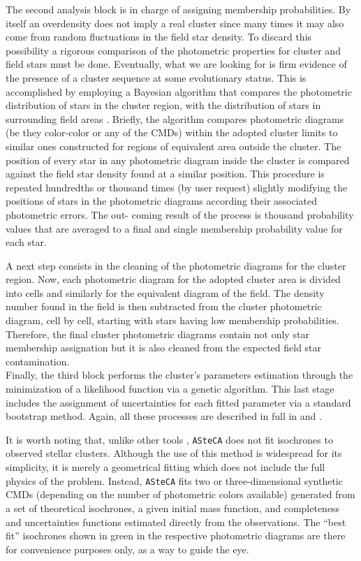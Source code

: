 \documentclass{aa}
\begin{document}
The second analysis block is in charge of assigning membership probabilities. By
itself an overdensity does not imply a real cluster since many times it may also
come from random fluctuations in the field star density. To discard this
possibility a rigorous comparison of the photometric
properties for cluster and field stars must be done. Eventually, what we
are looking for is firm evidence of the presence of a cluster sequence at some
evolutionary status. This is accomplished by employing a Bayesian algorithm that
compares the photometric distribution of stars in the cluster region, with the
distribution of stars in surrounding field areas \citep{Perren_2015}. Briefly,
the algorithm compares photometric diagrams (be they color-color or any of the
CMDs) within the adopted cluster limits to similar ones constructed for regions
of equivalent area outside the cluster. The position of every star in any
photometric diagram inside the cluster is compared against the field star
density found at a similar position. This procedure is repeated hundredths or
thousand times (by user request) slightly modifying the positions of stars in
the photometric diagrams according their associated photometric errors. The out-
coming result of the process is thousand probability values that are averaged to
a final and single membership probability value for each star.

A next step consists in the cleaning of the photometric diagrams for the cluster
region. Now, each photometric diagram for the adopted cluster area is divided
into cells and similarly for the equivalent diagram of the field. The
density number found in the field is then subtracted from the cluster
photometric diagram, cell by cell, starting with stars having low membership
probabilities. Therefore, the final cluster photometric diagrams contain not
only star membership assignation but it is also cleaned from the expected field
star contamination.\\

Finally, the third block performs the cluster's parameters estimation through
the minimization of a likelihood function via a genetic algorithm. This last
stage includes the assignment of uncertainties for each fitted parameter via a
standard bootstrap method. Again, all these processes are described in full in
\cite{Perren_2015} and \cite{Perren_2017}.

It is worth noting that, unlike other tools \citep[e.g.:][]{Yen_2018},
\texttt{ASteCA} does not fit isochrones to observed stellar clusters. Although
the use of this method is widespread for its simplicity, it is merely a
geometrical fitting which does not include the full physics of the problem.
Instead, \texttt{ASteCA} fits two or three-dimensional synthetic CMDs (depending
on the number of photometric colors available) generated from a set of
theoretical isochrones, a given initial mass function, and completeness and
uncertainties functions estimated directly from the observations. The ``best
fit'' isochrones shown in green in the respective photometric diagrams are there
for convenience purposes only, as a way to guide the eye.
\end{document}
